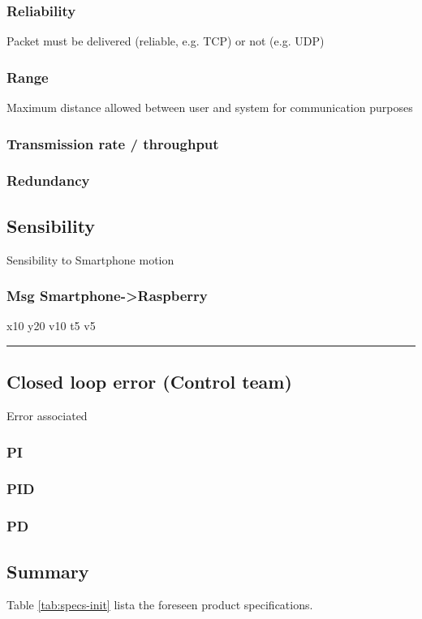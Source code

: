 \documentclass[11pt]{article}
\begin{document}
\subsubsection{Reliability}
\label{sec:org16f237c}
Packet must be delivered (reliable, e.g. TCP) or not (e.g. UDP)
\subsubsection{Range}
\label{sec:org4411fa9}
Maximum distance allowed between user and system for communication purposes
\subsubsection{Transmission rate / throughput}
\label{sec:org521acaa}
\subsubsection{Redundancy}
\label{sec:org0bf292e}
\subsection{Sensibility}
\label{sec:orgc4bd738}
Sensibility to Smartphone motion
\subsubsection{Msg Smartphone->Raspberry}
\label{sec:org9772f2c}
x10 y20 v10
t5 v5

\noindent\rule{\textwidth}{0.5pt}
\subsection{Closed loop error (Control team)}
\label{sec:org6959821}
Error associated
\subsubsection{PI}
\label{sec:org560e9eb}
\subsubsection{PID}
\label{sec:org0f78f13}
\subsubsection{PD}
\label{sec:org3a6cfe5}

\subsection{Summary}
\label{sec:org322183a}
Table \ref{tab:specs-init} lista the foreseen product specifications.
\end{document}
